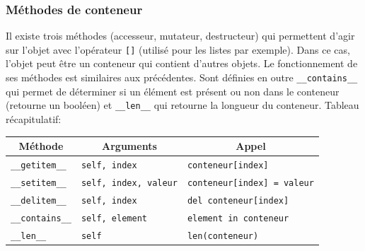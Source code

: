 \documentclass[a4paper, french, 10pt]{article}
\newcommand{\code}[1]{{\small\texttt{#1}}}
\begin{document}
\subsubsection{Méthodes de conteneur}
Il existe trois méthodes (accesseur, mutateur, destructeur) qui permettent d'agir sur l'objet avec l'opérateur \code{[]} (utilisé pour les listes par exemple). Dans ce cas, l'objet peut être un conteneur qui contient d'autres objets. Le fonctionnement de ses méthodes est similaires aux précédentes. Sont définies en outre \code{\_\_contains\_\_} qui permet de déterminer si un élément est présent ou non dans le conteneur (retourne un booléen) et \code{\_\_len\_\_} qui retourne la longueur du conteneur. Tableau récapitulatif:
\begin{center}
        \begin{tabular}{|p{2.5cm}|p{3.5 cm}|p{5cm}|}
        \hline
        \multicolumn{1}{|c}{\bf Méthode} & \multicolumn{1}{|c}{\bf Arguments} & \multicolumn{1}{|c|}{\bf Appel} \\
        \hline
        \code{\_\_getitem\_\_} & \code{self, index} & \code{conteneur[index]}\\
        \hline
        \code{\_\_setitem\_\_} & \code{self, index, valeur} & \code{conteneur[index] = valeur}\\
        \hline
        \code{\_\_delitem\_\_} & \code{self, index} & \code{del conteneur[index]}\\
        \hline
        \code{\_\_contains\_\_} & \code{self, element} & \code{element in conteneur}\\
        \hline
        \code{\_\_len\_\_} & \code{self} & \code{len(conteneur)}\\
        \hline
\end{tabular}
\end{center}
\end{document}

